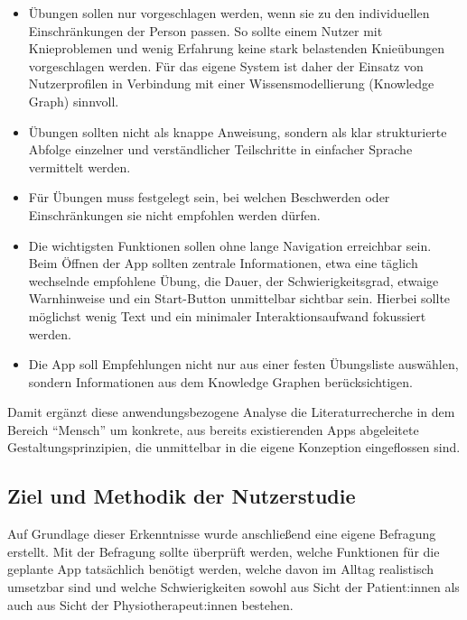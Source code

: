 \begin{itemize}
    \item Übungen sollen nur vorgeschlagen werden, wenn sie zu den individuellen Einschränkungen der Person passen. So sollte einem Nutzer mit Knieproblemen und wenig Erfahrung keine stark belastenden Knieübungen vorgeschlagen werden. Für das eigene System ist daher der Einsatz von Nutzerprofilen in Verbindung mit einer Wissensmodellierung (Knowledge Graph) sinnvoll.

    \item Übungen sollten nicht als knappe Anweisung, sondern als klar strukturierte Abfolge einzelner und verständlicher Teilschritte in einfacher Sprache vermittelt werden.

    \item Für Übungen muss festgelegt sein, bei welchen Beschwerden oder Einschränkungen sie nicht empfohlen werden dürfen.

    \item Die wichtigsten Funktionen sollen ohne lange Navigation erreichbar sein. Beim Öffnen der App sollten zentrale Informationen, etwa eine täglich wechselnde empfohlene Übung, die Dauer, der Schwierigkeitsgrad, etwaige Warnhinweise und ein Start-Button unmittelbar sichtbar sein. Hierbei sollte möglichst wenig Text und ein minimaler Interaktionsaufwand fokussiert werden.

    \item Die App soll Empfehlungen nicht nur aus einer festen Übungsliste auswählen, sondern Informationen aus dem Knowledge Graphen berücksichtigen.
\end{itemize}

Damit ergänzt diese anwendungsbezogene Analyse die Literaturrecherche in dem Bereich ``Mensch'' um konkrete, aus bereits existierenden Apps abgeleitete Gestaltungsprinzipien, die unmittelbar in die eigene Konzeption eingeflossen sind.

\subsection{Ziel und Methodik der Nutzerstudie}

Auf Grundlage dieser Erkenntnisse wurde anschließend eine eigene Befragung erstellt. Mit der Befragung sollte überprüft werden, welche Funktionen für die geplante App tatsächlich benötigt werden, welche davon im Alltag realistisch umsetzbar sind und welche Schwierigkeiten sowohl aus Sicht der Patient:innen als auch aus Sicht der Physiotherapeut:innen bestehen.

